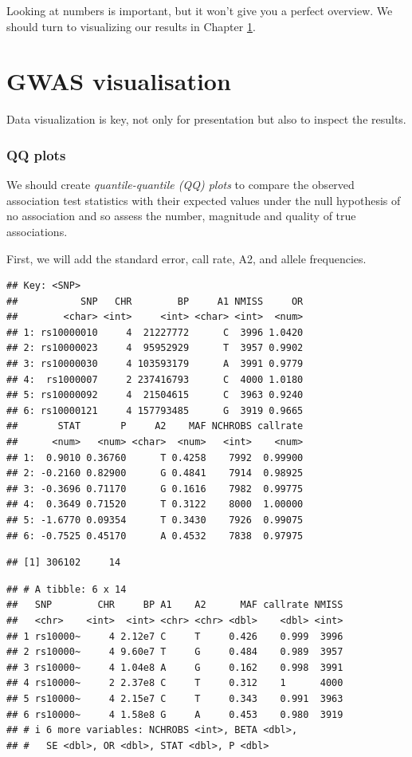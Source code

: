 \documentclass[
]{book}
\begin{document}
Looking at numbers is important, but it won't give you a perfect overview. We should turn to visualizing our results in Chapter \ref{gwas-visuals}.

\hypertarget{gwas-visuals}{%
\chapter{GWAS visualisation}\label{gwas-visuals}}

Data visualization is key, not only for presentation but also to inspect the results.

\hypertarget{qq-plots}{%
\subsection{QQ plots}\label{qq-plots}}

We should create \emph{quantile-quantile (QQ) plots} to compare the observed association test statistics with their expected values under the null hypothesis of no association and so assess the number, magnitude and quality of true associations.

First, we will add the standard error, call rate, A2, and allele frequencies.

\begin{lstlisting}
## Key: <SNP>
##           SNP   CHR        BP     A1 NMISS     OR
##        <char> <int>     <int> <char> <int>  <num>
## 1: rs10000010     4  21227772      C  3996 1.0420
## 2: rs10000023     4  95952929      T  3957 0.9902
## 3: rs10000030     4 103593179      A  3991 0.9779
## 4:  rs1000007     2 237416793      C  4000 1.0180
## 5: rs10000092     4  21504615      C  3963 0.9240
## 6: rs10000121     4 157793485      G  3919 0.9665
##       STAT       P     A2    MAF NCHROBS callrate
##      <num>   <num> <char>  <num>   <int>    <num>
## 1:  0.9010 0.36760      T 0.4258    7992  0.99900
## 2: -0.2160 0.82900      G 0.4841    7914  0.98925
## 3: -0.3696 0.71170      G 0.1616    7982  0.99775
## 4:  0.3649 0.71520      T 0.3122    8000  1.00000
## 5: -1.6770 0.09354      T 0.3430    7926  0.99075
## 6: -0.7525 0.45170      A 0.4532    7838  0.97975
\end{lstlisting}

\begin{lstlisting}
## [1] 306102     14
\end{lstlisting}

\begin{lstlisting}
## # A tibble: 6 x 14
##   SNP        CHR     BP A1    A2      MAF callrate NMISS
##   <chr>    <int>  <int> <chr> <chr> <dbl>    <dbl> <int>
## 1 rs10000~     4 2.12e7 C     T     0.426    0.999  3996
## 2 rs10000~     4 9.60e7 T     G     0.484    0.989  3957
## 3 rs10000~     4 1.04e8 A     G     0.162    0.998  3991
## 4 rs10000~     2 2.37e8 C     T     0.312    1      4000
## 5 rs10000~     4 2.15e7 C     T     0.343    0.991  3963
## 6 rs10000~     4 1.58e8 G     A     0.453    0.980  3919
## # i 6 more variables: NCHROBS <int>, BETA <dbl>,
## #   SE <dbl>, OR <dbl>, STAT <dbl>, P <dbl>
\end{lstlisting}
\end{document}
